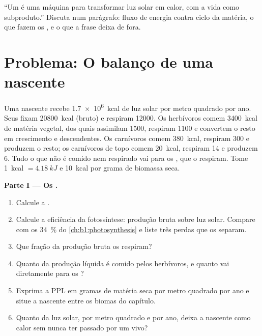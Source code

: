 \begin{exercise}[$\star\star\star$]\label{exo:b1:ecosystem-organization:12}
``Um  é uma máquina para transformar luz solar em calor,
com a vida como subproduto.'' Discuta num parágrafo: fluxo de energia
contra ciclo da matéria, o que fazem os , e o que a
frase deixa de fora.
\end{exercise}

\section{Problema: O balanço de uma nascente}

\begin{problem}
\label{pb:b1:ecosystem-organization:1}
Uma nascente recebe \qty{1.7e6}{kcal} de luz solar por metro quadrado
por ano. Seus  fixam \qty{20800}{kcal} (bruto) e respiram
\qty{12000}{}. Os herbívoros comem \qty{3400}{kcal} de matéria
vegetal, dos quais assimilam \qty{1500}{}, respiram \qty{1100}{} e
convertem o resto em crescimento e descendentes. Os carnívoros comem
\qty{380}{kcal}, respiram \qty{300}{} e produzem o resto; os carnívoros
de topo comem \qty{20}{kcal}, respiram \qty{14}{} e produzem
\qty{6}{}. Tudo o que não é comido nem respirado vai para os
, que o respiram. Tome \qty{1}{kcal} $= \qty{4.18}{kJ}$
e \qty{10}{kcal} por grama de biomassa seca.

\medskip
\noindent\textbf{Parte I --- Os .}
\begin{enumerate}
  \item Calcule a .
  \item Calcule a eficiência da fotossíntese: produção bruta sobre luz
        solar. Compare com os \qty{34}{\%} do
        \cref{ch:b1:photosynthesis} e liste três perdas que os
        separam.
  \item Que fração da produção bruta os  respiram?
  \item Quanto da produção líquida é comido pelos herbívoros, e quanto
        vai diretamente para os ?
  \item Exprima a PPL em gramas de matéria seca por metro quadrado por
        ano e situe a nascente entre os biomas do capítulo.
  \item Quanto da luz solar, por metro quadrado e por ano, deixa a
        nascente como calor sem nunca ter passado por um 
        vivo?
\end{enumerate}


\end{problem}

